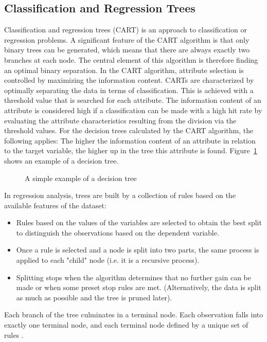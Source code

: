 \subsection{Classification and Regression Trees}
Classification and regression trees (CART) is an approach to classification or regression problems. A significant feature of the CART algorithm is that only binary trees can be generated, which means that there are always exactly two branches at each node. The central element of this algorithm is therefore finding an optimal binary separation.
In the CART algorithm, attribute selection is controlled by maximizing the information content. CARTs are characterized by optimally separating the data in terms of classification. This is achieved with a threshold value that is searched for each attribute. The information content of an attribute is considered high if a classification can be made with a high hit rate by evaluating the attribute characteristics resulting from the division via the threshold values. For the decision trees calculated by the CART algorithm, the following applies: The higher the information content of an attribute in relation to the target variable, the higher up in the tree this attribute is found. Figure~\ref{fig:tree} shows an example of a decision tree.
\begin{figure}[H]
    \centering
    \caption{A simple example of a decision tree}
    \label{fig:tree}
\end{figure}
In regression analysis, trees are built by a collection of rules based on the available features of the dataset:
\begin{itemize}
    \item Rules based on the values of the variables are selected to obtain the best split to distinguish the observations based on the dependent variable.
    \item Once a rule is selected and a node is split into two parts, the same process is applied to each "child" node (i.e. it is a recursive process).
    \item Splitting stops when the algorithm determines that no further gain can be made or when some preset stop rules are met. (Alternatively, the data is split as much as possible and the tree is pruned later).
\end{itemize}
Each branch of the tree culminates in a terminal node. Each observation falls into exactly one terminal node, and each terminal node defined by a unique set of rules \autocite[][]{breiman1984classification}.
